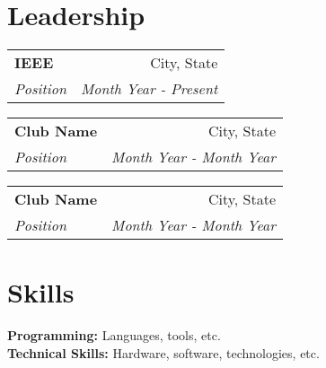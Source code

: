 \documentclass[letterpaper,18pt]{article}
\makeatletter
\newcommand{\resumeSection}[1]{\vspace{-10pt} \section{#1}}
\newcommand{\resumeSubHeading}[4]{
    \vspace{-1pt}
    \begin{tabular*}{\textwidth}{l@{\extracolsep{\fill}}r}
        \textbf{#1} & #2 \vspace{-2pt} \\
        \textit{\small #3} & \textit{\small #4} \\
    \end{tabular*}
}
\makeatother
\begin{document}
\resumeSection{Leadership}
\resumeSubHeading{IEEE}{City, State}{Position}{Month Year - Present}
\resumeSubHeading{Club Name}{City, State}{Position}{Month Year - Month Year}
\resumeSubHeading{Club Name}{City, State}{Position}{Month Year - Month Year}

\resumeSection{Skills}
\small \textbf{Programming: }{Languages, tools, etc.} \\
\textbf{Technical Skills: }{Hardware, software, technologies, etc.}

\end{document}
